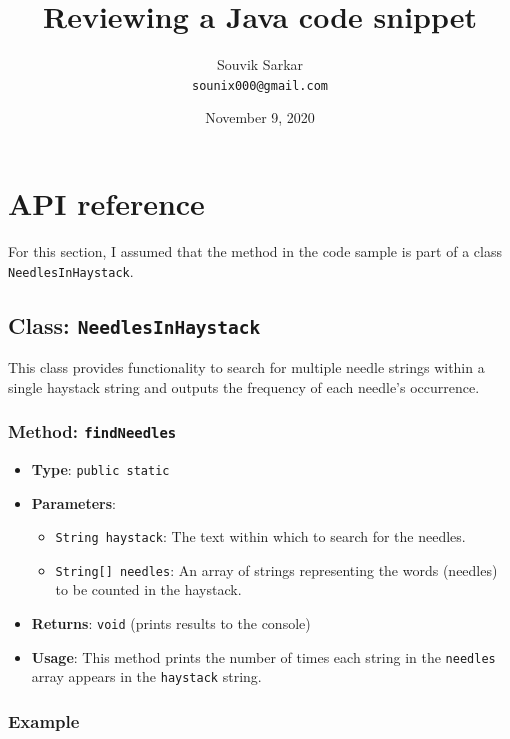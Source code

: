 \documentclass{article}
\title{\bfseries Reviewing a Java code snippet}
\author{Souvik Sarkar \\ \texttt{sounix000@gmail.com}} %
\date{November 9, 2020}
\begin{document}
\maketitle %

\section*{API reference}

For this section, I assumed that the method in the code sample is part of a class \texttt{NeedlesInHaystack}.

\subsection*{Class: \texttt{NeedlesInHaystack}}

This class provides functionality to search for multiple needle strings within a single haystack string and outputs the frequency of each needle's occurrence.

\subsubsection*{Method: \texttt{findNeedles}}

\begin{itemize}
    \item \textbf{Type}: \texttt{public static}
    
    \item \textbf{Parameters}:
    \begin{itemize}
        \item \texttt{String haystack}: The text within which to search for the needles.
        \item \texttt{String[] needles}: An array of strings representing the words (needles) to be counted in the haystack.
    \end{itemize}
    
    \item \textbf{Returns}: \texttt{void} (prints results to the console)
    
    \item \textbf{Usage}: This method prints the number of times each string in the \texttt{needles} array appears in the \texttt{haystack} string.
\end{itemize}

\subsubsection*{Example}
\end{document}
